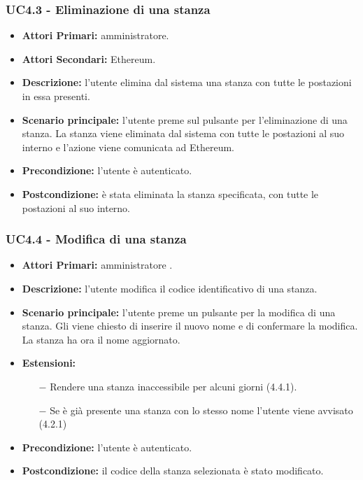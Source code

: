 \subsubsection{ UC4.3 - Eliminazione di una stanza}
\begin{itemize}
	\item\textbf{Attori Primari:}
	amministratore.
	\item\textbf{Attori Secondari:}
	Ethereum.
	\item\textbf{Descrizione:} 
	l'utente elimina dal sistema una stanza con tutte le postazioni in essa presenti.
	\item\textbf{Scenario principale:} 
	l'utente preme sul pulsante per l'eliminazione di una stanza. La stanza viene eliminata dal sistema con tutte le postazioni al suo interno e l'azione viene comunicata ad Ethereum.
	\item\textbf{Precondizione:} 
	l'utente è autenticato.
	\item\textbf{Postcondizione:}
	è stata eliminata la stanza specificata, con tutte le postazioni al suo interno.
\end{itemize}

\subsubsection{UC4.4 - Modifica di una stanza}
\begin{itemize}
	\item\textbf{Attori Primari:}
	amministratore .
	\item\textbf{Descrizione:}
	l'utente modifica il codice identificativo di una stanza.
	\item\textbf{Scenario principale:} 
	l'utente preme un pulsante per la modifica di una stanza. Gli viene chiesto di inserire il nuovo nome e di confermare la modifica. La stanza ha ora il nome aggiornato.
	\item\textbf{Estensioni:}
	\begin{itemize}
		\item[$-$] Rendere una stanza inaccessibile per alcuni giorni (4.4.1).
		\item[$-$] Se è già presente una stanza con lo stesso nome l'utente viene avvisato (4.2.1)
	\end{itemize}

	\item\textbf{Precondizione:} 
	l'utente è autenticato.
	\item\textbf{Postcondizione:}
	il codice della stanza selezionata è stato modificato.
\end{itemize}

